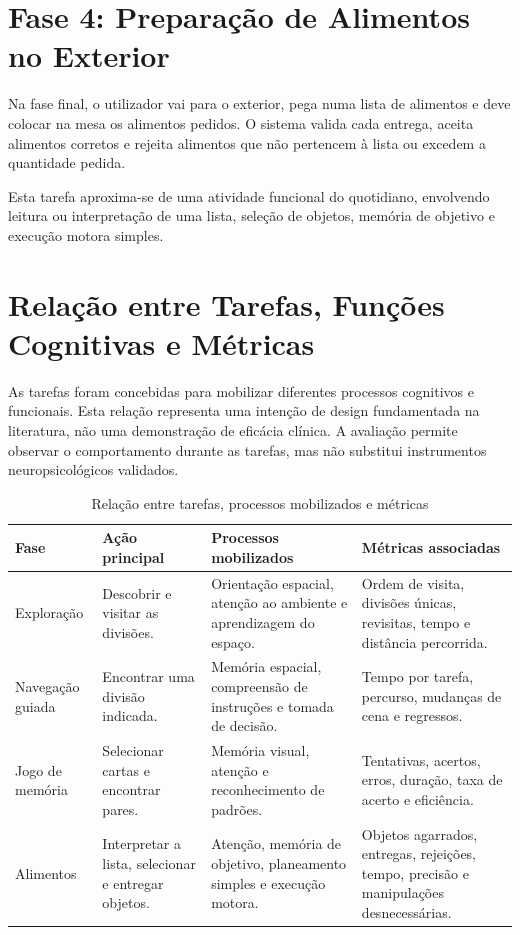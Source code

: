 \documentclass[12pt,a4paper,oneside]{report}
\begin{document}
\section{Fase 4: Preparação de Alimentos no Exterior}

Na fase final, o utilizador vai para o exterior, pega numa lista de alimentos e deve colocar na mesa os alimentos pedidos. O sistema valida cada entrega, aceita alimentos corretos e rejeita alimentos que não pertencem à lista ou excedem a quantidade pedida.

Esta tarefa aproxima-se de uma atividade funcional do quotidiano, envolvendo leitura ou interpretação de uma lista, seleção de objetos, memória de objetivo e execução motora simples.

\section{Relação entre Tarefas, Funções Cognitivas e Métricas}

As tarefas foram concebidas para mobilizar diferentes processos cognitivos e funcionais. Esta relação representa uma intenção de design fundamentada na literatura, não uma demonstração de eficácia clínica. A avaliação permite observar o comportamento durante as tarefas, mas não substitui instrumentos neuropsicológicos validados.

\begin{table}[H]
\centering
\caption{Relação entre tarefas, processos mobilizados e métricas}
\label{tab:tarefas-cognicao-metricas}
\begin{tabular}{p{2.1cm}p{2.8cm}p{3.2cm}p{3.7cm}}
\toprule
\textbf{Fase} & \textbf{Ação principal} & \textbf{Processos mobilizados} & \textbf{Métricas associadas} \\
\midrule
Exploração & Descobrir e visitar as divisões. & Orientação espacial, atenção ao ambiente e aprendizagem do espaço. & Ordem de visita, divisões únicas, revisitas, tempo e distância percorrida. \\
Navegação guiada & Encontrar uma divisão indicada. & Memória espacial, compreensão de instruções e tomada de decisão. & Tempo por tarefa, percurso, mudanças de cena e regressos. \\
Jogo de memória & Selecionar cartas e encontrar pares. & Memória visual, atenção e reconhecimento de padrões. & Tentativas, acertos, erros, duração, taxa de acerto e eficiência. \\
Alimentos & Interpretar a lista, selecionar e entregar objetos. & Atenção, memória de objetivo, planeamento simples e execução motora. & Objetos agarrados, entregas, rejeições, tempo, precisão e manipulações desnecessárias. \\
\bottomrule
\end{tabular}
\end{table}
\end{document}
